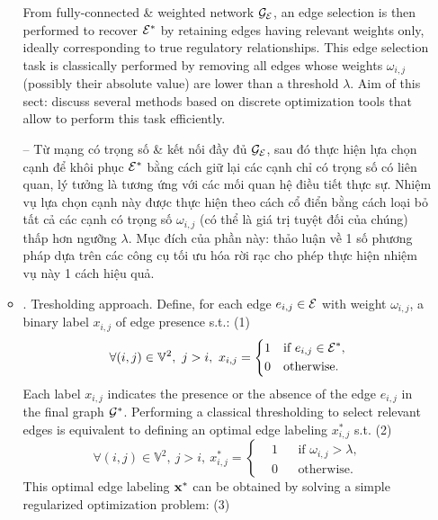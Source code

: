 \documentclass{article}
\begin{document}
\begin{itemize}
\begin{itemize}
        From fully-connected \& weighted network $\cal G_E$, an edge selection is then performed to recover ${\cal E}^*$ by retaining edges having relevant weights only, ideally corresponding to true regulatory relationships. This edge selection task is classically performed by removing all edges whose weights $\omega_{i,j}$ (possibly their absolute value) are lower than a threshold $\lambda$. Aim of this sect: discuss several methods based on discrete optimization tools that allow to perform this task efficiently.
        
        -- Từ mạng có trọng số \& kết nối đầy đủ $\cal G_E$, sau đó thực hiện lựa chọn cạnh để khôi phục ${\cal E}^*$ bằng cách giữ lại các cạnh chỉ có trọng số có liên quan, lý tưởng là tương ứng với các mối quan hệ điều tiết thực sự. Nhiệm vụ lựa chọn cạnh này được thực hiện theo cách cổ điển bằng cách loại bỏ tất cả các cạnh có trọng số $\omega_{i,j}$ (có thể là giá trị tuyệt đối của chúng) thấp hơn ngưỡng $\lambda$. Mục đích của phần này: thảo luận về 1 số phương pháp dựa trên các công cụ tối ưu hóa rời rạc cho phép thực hiện nhiệm vụ này 1 cách hiệu quả.
        \item {. Tresholding approach.} Define, for each edge $e_{i,j}\in{\cal E}$ with weight $\omega_{i,j}$, a binary label $x_{i,j}$ of edge presence s.t.: (1)
        \begin{equation*}
            \forall(i,j)\in\mathbb{V}^2,\ j > i,\ x_{i,j} = \left\{\begin{split}
                &1&&\mbox{if } e_{i,j}\in{\cal E}^*,\\
                &0&&\mbox{otherwise}.
            \end{split}\right.
        \end{equation*}
        Each label $x_{i,j}$ indicates the presence or the absence of the edge $e_{i,j}$ in the final graph ${\cal G}^*$. Performing a classical thresholding to select relevant edges is equivalent to defining an optimal edge labeling $x_{i,j}^*$ s.t. (2)
        \begin{equation*}
            \forall(i,j)\in\mathbb{V}^2,\ j > i,\ x_{i,j}^* = \left\{\begin{split}
                &1&&\mbox{if } \omega_{i,j} > \lambda,\\
                &0&&\mbox{otherwise}.
            \end{split}\right.
        \end{equation*}
        This optimal edge labeling ${\bf x}^*$ can be obtained by solving a simple regularized optimization problem: (3)

\end{itemize}
\end{itemize}
\end{document}
